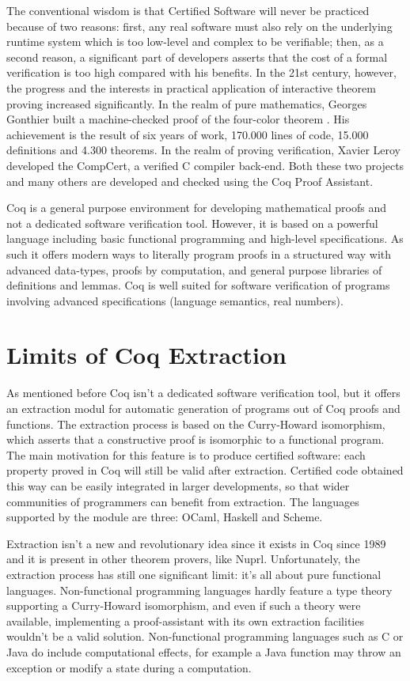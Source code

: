 \documentclass[target=mst,babel=\babelopt]{thud}[2014/01/17]
\begin{document}
The conventional wisdom is that Certified Software will never be
practiced because of two reasons: first, any real software must also rely on the underlying runtime system
which is too low-level and complex to be verifiable; then, as a second
reason, a significant part of developers asserts that the cost of a
formal verification is too high compared with his benefits.
In the 21st century, however, the progress and the interests in practical application of
interactive theorem proving increased significantly. In the realm of
pure mathematics, Georges Gonthier built a machine-checked proof of 
the four-color theorem \cite{Gonthier08}. His achievement is the result of six years of
work, 170.000 lines of code, 15.000 definitions and 4.300 theorems. 
In the realm of proving verification, Xavier Leroy developed the
CompCert, a verified C compiler back-end\cite{Compcert}.
Both these two projects and many others \cite{JSCert} are developed and
checked using the Coq Proof Assistant.


Coq is a general purpose environment for developing mathematical
proofs and not a dedicated software verification tool.
However, it is based on a powerful language including basic functional
programming and high-level specifications.
As such it offers modern ways to literally program proofs in a
structured way with advanced data-types, proofs by computation, and general purpose libraries of definitions and lemmas.
Coq is well suited for software verification of programs involving
advanced specifications (language semantics, real numbers). 
\cite{paulinintroduction}


\section{Limits of Coq Extraction}
As mentioned before Coq isn't a dedicated software verification tool,
but it offers an extraction modul for automatic generation of
programs out of Coq proofs and functions. The extraction process
 is based on the Curry-Howard isomorphism, which asserts that a constructive proof is isomorphic to
a functional program.  The main motivation for this feature is to produce certified software: each
property proved in Coq will still be valid after extraction. Certified
code obtained this way can be easily integrated in larger
developments, so that wider communities of programmers can benefit from extraction.
The languages supported by the module are three:
OCaml, Haskell and Scheme.


Extraction isn't a new
and revolutionary idea since it exists in Coq since 1989 and it is
present in other theorem provers, like Nuprl\cite{Nuprl}. Unfortunately,
the extraction process has still one significant limit: it's all
about pure functional languages. 
Non-functional programming languages hardly feature a type
theory supporting a Curry-Howard isomorphism, and even if such a
theory were available, implementing a proof-assistant with its own
extraction facilities wouldn't be a valid solution.
Non-functional programming languages such as C or Java do include
computational effects, for example a Java function may throw an
exception or modify a state during a computation.
\end{document}
